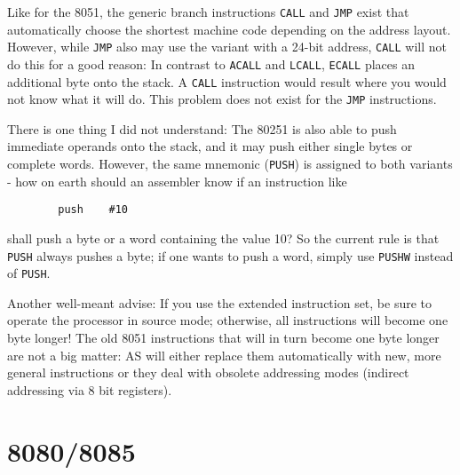 \documentclass[12pt,twoside]{report}
\newcommand{\tty}[1]{{\tt #1}}
\begin{document}
Like for the 8051, the generic branch instructions \tty{CALL} and
\tty{JMP} exist that automatically choose the shortest machine code
depending on the address layout.  However, while \tty{JMP} also may use
the variant with a 24-bit address, \tty{CALL} will not do this for a good
reason: In contrast to \tty{ACALL} and \tty{LCALL}, \tty{ECALL} places an
additional byte onto the stack.  A \tty{CALL} instruction would result where
you would not know what it will do.  This problem does not exist for the
\tty{JMP} instructions.

There is one thing I did not understand: The 80251 is also able to
push immediate operands onto the stack, and it may push either single
bytes or complete words.  However, the same mnemonic (\tty{PUSH}) is
assigned to both variants - how on earth should an assembler know if
an instruction like
\begin{verbatim}
        push    #10
\end{verbatim}
shall push a byte or a word containing the value 10?  So the current
rule is that \tty{PUSH} always pushes a byte; if one wants to push a word,
simply use \tty{PUSHW} instead of \tty{PUSH}.

Another well-meant advise: If you use the extended instruction set,
be sure to operate the processor in source mode; otherwise, all
instructions will become one byte longer!  The old 8051 instructions
that will in turn become one byte longer are not a big matter:  AS
will either replace them automatically with new, more general
instructions or they deal with obsolete addressing modes (indirect
addressing via 8 bit registers).


\section{8080/8085}
\label{8080Spec}
\end{document}
